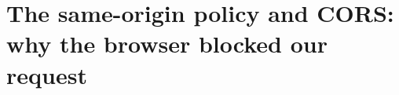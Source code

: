 \chapter{The same-origin policy and CORS: why the browser blocked our request}
\label{ch:the-same-origin-policy-and-cors-why-the}

